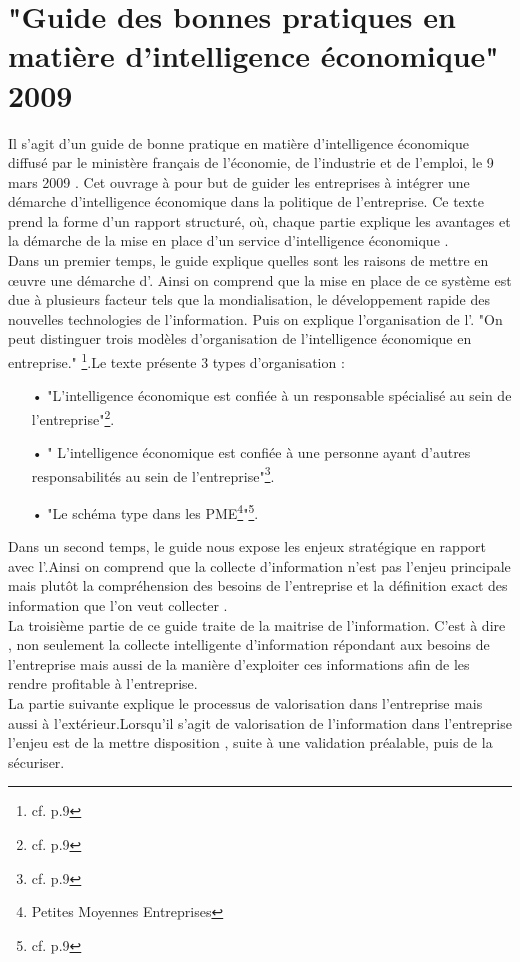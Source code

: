  \part{"Guide des bonnes pratiques en matière d'intelligence économique" 2009}
 
 Il s'agit d'un guide de bonne pratique en matière d'intelligence économique diffusé par le ministère français  de l'économie, de l'industrie et de l'emploi, le 9 mars 2009 . Cet ouvrage à pour but de guider les entreprises à intégrer une démarche d'intelligence économique dans la politique de l'entreprise. Ce texte prend la forme d'un rapport structuré, où, chaque partie explique les avantages et la démarche de la mise en place d'un service d'intelligence économique .  \\
 
 
 Dans un premier temps, le guide explique quelles sont les raisons de mettre en œuvre une démarche d'\ie . Ainsi on comprend que la mise en place de ce système est due à plusieurs facteur tels que la mondialisation, le développement rapide des nouvelles technologies de l'information. Puis on explique l'organisation de l'\ie . "On peut distinguer trois modèles d'organisation de l'intelligence économique en entreprise." \footnote{cf. p.9}.Le texte présente 3 types d'organisation :
 \begin{itemize}
 	\item[•] "L'intelligence économique est confiée à un responsable spécialisé au sein de l'entreprise"\footnote{cf. p.9}.
 	\item[•]" L'intelligence économique est confiée à une personne ayant d'autres responsabilités au sein de l'entreprise"\footnote{cf. p.9}.
	\item[•] "Le schéma type dans les PME\footnote{Petites Moyennes Entreprises}"\footnote{cf. p.9}.
 \end{itemize}
 Dans un second temps, le guide nous expose les enjeux stratégique en rapport avec l'\ie .Ainsi on comprend que la collecte d'information n'est pas l'enjeu principale mais plutôt la compréhension des besoins de l'entreprise et la définition exact des information que l'on veut collecter .\\
 La troisième partie de ce guide traite de la maitrise de l'information. C'est à dire , non seulement la collecte intelligente  d'information répondant aux besoins de l'entreprise mais aussi de la manière d'exploiter ces informations afin de les rendre profitable à l'entreprise. \\
 La partie suivante explique le processus de valorisation dans l'entreprise mais aussi à l'extérieur.Lorsqu'il s'agit de valorisation de l'information dans l'entreprise l'enjeu est de la mettre disposition , suite à une validation préalable, puis de la sécuriser.\\

